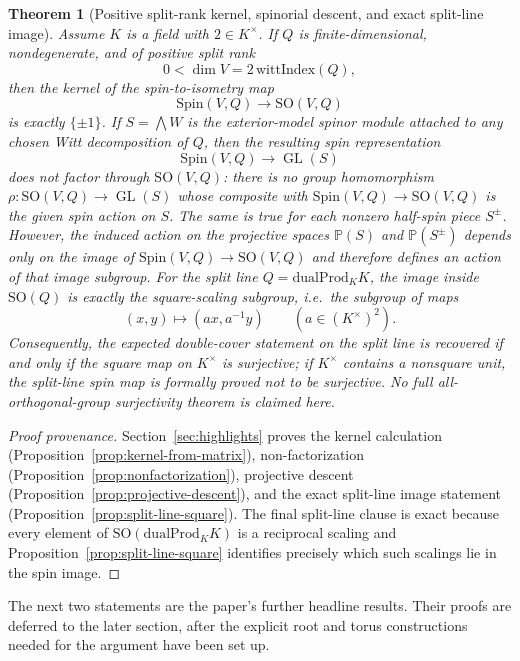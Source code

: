 \documentclass{birkjour}
\theoremstyle{plain}
\newtheorem{theorem}{Theorem}[section]
\theoremstyle{definition}
\theoremstyle{remark}
\newcommand{\Spin}{\mathrm{Spin}}
\newcommand{\SO}{\mathrm{SO}}
\newcommand{\dualProd}{\mathrm{dualProd}}
\begin{document}
\begin{theorem}[Positive split-rank kernel, spinorial descent, and exact split-line image]
\label{thm:kernel-nonfactor-split-line}
Assume $K$ is a field with $2\in K^\times$. If $Q$ is finite-dimensional,
nondegenerate, and of positive split rank
\[
  0<\dim V = 2\,\mathrm{wittIndex}(Q),
\]
then the kernel of the spin-to-isometry map
\[
  \Spin(V,Q) \to \SO(V,Q)
\]
is exactly $\{\pm1\}$. If $S=\bigwedge W$ is the exterior-model spinor module
attached to any chosen Witt decomposition of $Q$, then the resulting spin
representation
\[
  \Spin(V,Q) \to \operatorname{GL}(S)
\]
does not factor through $\SO(V,Q)$: there is no group homomorphism
$\rho:\SO(V,Q)\to \operatorname{GL}(S)$ whose composite with
$\Spin(V,Q)\to\SO(V,Q)$ is the given spin action on $S$. The same is true for
each nonzero half-spin piece $S^\pm$. However, the induced action on the
projective spaces $\mathbb{P}(S)$ and $\mathbb{P}(S^\pm)$ depends only on the
image of $\Spin(V,Q)\to\SO(V,Q)$ and therefore defines an action of that image
subgroup. For the split line $Q=\dualProd_K K$, the image inside $\SO(Q)$ is
exactly the square-scaling subgroup, i.e.\ the subgroup of maps
\[
  (x,y)\longmapsto (a x, a^{-1} y)
  \qquad (a\in (K^\times)^2).
\]
Consequently, the expected double-cover statement on the split line is recovered
if and only if the square map on $K^\times$ is surjective; if $K^\times$
contains a nonsquare unit, the split-line spin map is formally proved not to be
surjective. No full all-orthogonal-group surjectivity theorem is claimed here.
\end{theorem}

\begin{proof}[Proof provenance]
Section~\ref{sec:highlights} proves the kernel calculation
(Proposition~\ref{prop:kernel-from-matrix}), non-factorization
(Proposition~\ref{prop:nonfactorization}), projective descent
(Proposition~\ref{prop:projective-descent}), and the exact split-line image
statement (Proposition~\ref{prop:split-line-square}). The final split-line
clause is exact because every element of $\SO(\dualProd_K K)$ is a reciprocal
scaling and Proposition~\ref{prop:split-line-square} identifies precisely which
such scalings lie in the spin image.
\end{proof}

The next two statements are the paper's further headline results. Their proofs
are deferred to the later section, after the explicit root and torus
constructions needed for the argument have been set up.
\end{document}
